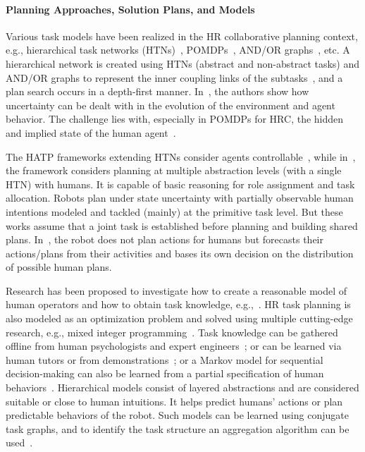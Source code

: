 \documentclass[letterpaper]{article} %
\begin{document}
\paragraph{Planning Approaches, Solution Plans, and Models}
Various task models have been realized in the HR collaborative planning context, e.g., hierarchical task networks (HTNs)~\cite{lallement2018hatp,roncone2017transparent}, POMDPs~\cite{UnhelkarLS19,roncone2017transparent,UnhelkarLS20}, AND/OR graphs~\cite{DarvishSMC21}, etc.
A hierarchical network is created using HTNs (abstract and non-abstract tasks) and AND/OR graphs to represent the inner coupling links of the subtasks~\cite{GombolayJSSS16},
and a plan search occurs in a depth-first manner. In~\cite{HorgerKE19}, the authors show how uncertainty can be dealt with in the evolution of the environment and agent behavior. The challenge lies with, especially in POMDPs for HRC, the hidden and implied state of the human agent~\cite{UnhelkarLS20}.

The HATP frameworks extending HTNs consider agents controllable~\cite{alami2006toward,lallement2018hatp}, while in~\cite{roncone2017transparent}, the framework considers planning at multiple abstraction levels (with a single HTN) with humans. 
It is capable of basic reasoning for role assignment and task allocation. Robots plan under state uncertainty with partially observable human intentions modeled and tackled (mainly) at the primitive task level. But these works assume that a joint task is established before planning and building shared plans. In~\cite{CirilloKS09}, the robot does not plan actions for humans but forecasts their actions/plans from their activities and bases its own decision on the distribution of possible human plans.

Research has been proposed to investigate how to create a reasonable model of human operators and how to obtain task knowledge, e.g.,~\cite{unhelkar2019learning}. 
HR task planning is also modeled as an optimization problem and solved using multiple cutting-edge research, e.g., mixed integer programming~\cite{VatsKL22}. 
Task knowledge can be gathered offline from human psychologists and expert engineers~\cite{levine2014concurrent,wang2018robot,CirilloKS09}; or can be learned via human tutors or from demonstrations~\cite{koppula2016anticipatory}; or a Markov model for sequential decision-making can also be learned from a partial specification of human behaviors~\cite{unhelkar2019learning}. 
% 
Hierarchical models consist of layered abstractions and are considered suitable or close to human intuitions. It helps predict humans' actions or plan predictable behaviors of the robot. 
Such models can be learned using conjugate task graphs, and to identify the task structure an aggregation algorithm can be used~\cite{HayesS16}. 
\end{document}
